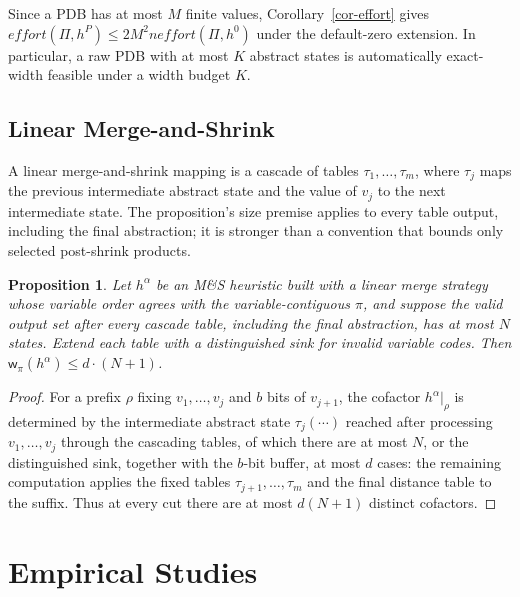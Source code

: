 \documentclass[letterpaper]{article}
\newcommand{\task}{\ensuremath{\Pi}}
\newcommand{\hblind}{\ensuremath{h^{0}}}
\newcommand{\width}{\ensuremath{\mathsf{w}}}
\newcommand{\effort}{\ensuremath{\mathit{effort}}}
\theoremstyle{plain}
\newtheorem{proposition}{Proposition}
\theoremstyle{definition}
\theoremstyle{remark}
\begin{document}
Since a PDB has at most $M$ finite values,
Corollary~\ref{cor-effort} gives
$\effort(\task,h^P)\leq2M^2n\effort(\task,\hblind)$ under the default-zero
extension. In particular, a raw PDB with at most $K$ abstract states is
automatically exact-width feasible under a width budget $K$.

\subsection{Linear Merge-and-Shrink}

A linear merge-and-shrink mapping is a cascade of tables
$\tau_1,\dots,\tau_m$, where $\tau_j$ maps the previous intermediate
abstract state and the value of $v_j$ to the next intermediate state.
The proposition's size premise applies to every table output, including the
final abstraction; it is stronger than a convention that bounds only selected
post-shrink products.

\begin{proposition}
\label{prop-ms}
Let $h^{\alpha}$ be an M\&S heuristic built with a linear merge
strategy whose variable order agrees with the variable-contiguous
$\pi$, and suppose the valid output set after every cascade table, including
the final abstraction, has at most $N$ states. Extend each
table with a distinguished sink for invalid variable codes. Then
$\width_\pi(h^{\alpha}) \leq d \cdot (N+1)$.
\end{proposition}

\begin{proof}
For a prefix $\rho$ fixing $v_1, \dots, v_j$ and $b$ bits of
$v_{j+1}$, the cofactor $h^{\alpha}|_\rho$ is determined by the
intermediate abstract state $\tau_j(\cdots)$ reached after processing
$v_1, \dots, v_j$ through the cascading tables, of which there are at
most $N$, or the distinguished sink, together with the $b$-bit buffer,
at most $d$ cases: the
remaining computation applies the fixed tables
$\tau_{j+1}, \dots, \tau_m$ and the final distance table to the suffix.
Thus at every cut there are at most $d(N+1)$ distinct cofactors.
\end{proof}



\clearpage
\section{Empirical Studies}
\label{sec:supp-predictors}
\end{document}

